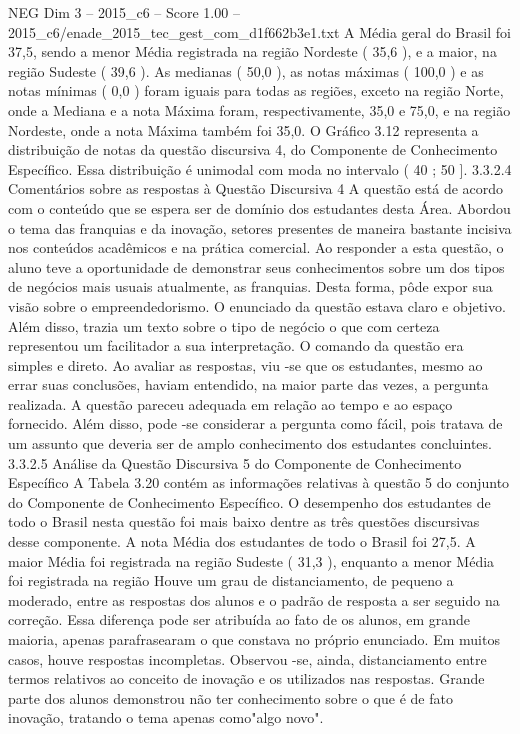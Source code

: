 \begin{textsample}{NEG Dim 3 – 2015\_c6 – Score 1.00 – 2015\_c6/enade\_2015\_tec\_gest\_com\_d1f662b3e1.txt}
A Média geral do Brasil foi 37,5, sendo a menor Média registrada na região Nordeste ( 35,6 ), e a maior, na região Sudeste ( 39,6 ).
As medianas ( 50,0 ), as notas máximas ( 100,0 ) e as notas mínimas ( 0,0 ) foram iguais para todas as regiões, exceto na região Norte, onde a Mediana e a nota Máxima foram, respectivamente, 35,0 e 75,0, e na região Nordeste, onde a nota Máxima também foi 35,0.
O Gráfico 3.12 representa a distribuição de notas da questão discursiva 4, do Componente de Conhecimento Específico.
Essa distribuição é unimodal com moda no intervalo ( 40 ; 50 ]. 3.3.2.4 Comentários sobre as respostas à Questão Discursiva 4 A questão está de acordo com o conteúdo que se espera ser de domínio dos estudantes desta Área.
Abordou o tema das franquias e da inovação, setores presentes de maneira bastante incisiva nos conteúdos acadêmicos e na prática comercial.
Ao responder a esta questão, o aluno teve a oportunidade de demonstrar seus conhecimentos sobre um dos tipos de negócios mais usuais atualmente, as franquias.
Desta forma, pôde expor sua visão sobre o empreendedorismo.
O enunciado da questão estava claro e objetivo.
Além disso, trazia um texto sobre o tipo de negócio o que com certeza representou um facilitador a sua interpretação.
O comando da questão era simples e direto.
Ao avaliar as respostas, viu -se que os estudantes, mesmo ao errar suas conclusões, haviam entendido, na maior parte das vezes, a pergunta realizada.
A questão pareceu adequada em relação ao tempo e ao espaço fornecido.
Além disso, pode -se considerar a pergunta como fácil, pois tratava de um assunto que deveria ser de amplo conhecimento dos estudantes concluintes. 3.3.2.5 Análise da Questão Discursiva 5 do Componente de Conhecimento Específico A Tabela 3.20 contém as informações relativas à questão 5 do conjunto do Componente de Conhecimento Específico.
O desempenho dos estudantes de todo o Brasil nesta questão foi mais baixo dentre as três questões discursivas desse componente.
A nota Média dos estudantes de todo o Brasil foi 27,5.
A maior Média foi registrada na região Sudeste ( 31,3 ), enquanto a menor Média foi registrada na região Houve um grau de distanciamento, de pequeno a moderado, entre as respostas dos alunos e o padrão de resposta a ser seguido na correção.
Essa diferença pode ser atribuída ao fato de os alunos, em grande maioria, apenas parafrasearam o que constava no próprio enunciado.
Em muitos casos, houve respostas incompletas.
Observou -se, ainda, distanciamento entre termos relativos ao conceito de inovação e os utilizados nas respostas.
Grande parte dos alunos demonstrou não ter conhecimento sobre o que é de fato inovação, tratando o tema apenas como"algo novo".

\end{textsample}
